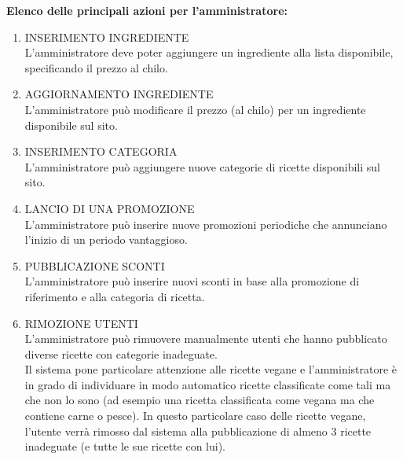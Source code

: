 \textbf{Elenco delle principali azioni per l'amministratore:}\\

\begin{enumerate}[label=\textbf{A\arabic* - }, leftmargin=1.2cm, itemsep=0.8em]

    \item INSERIMENTO INGREDIENTE\\
    L’amministratore deve poter aggiungere un ingrediente alla lista disponibile, specificando il prezzo al chilo.

    \item AGGIORNAMENTO INGREDIENTE\\
    L’amministratore può modificare il prezzo (al chilo) per un ingrediente disponibile sul sito.

    \item INSERIMENTO CATEGORIA\\
    L’amministratore può aggiungere nuove categorie di ricette disponibili sul sito.

    \item LANCIO DI UNA PROMOZIONE\\
    L’amministratore può inserire nuove promozioni periodiche che annunciano l’inizio di un periodo vantaggioso.

    \item PUBBLICAZIONE SCONTI\\
    L’amministratore può inserire nuovi sconti in base alla promozione di riferimento e alla categoria di ricetta.

    \item RIMOZIONE UTENTI\\
    L’amministratore può rimuovere manualmente utenti che hanno pubblicato diverse ricette con categorie inadeguate. \\
    Il sistema pone particolare attenzione alle ricette vegane e l’amministratore è in grado di individuare in modo automatico ricette classificate come tali ma che non lo sono (ad esempio una ricetta classificata come vegana ma che contiene carne o pesce). In questo particolare caso delle ricette vegane, l’utente verrà rimosso dal sistema alla pubblicazione di almeno 3 ricette inadeguate (e tutte le sue ricette con lui).

\end{enumerate}